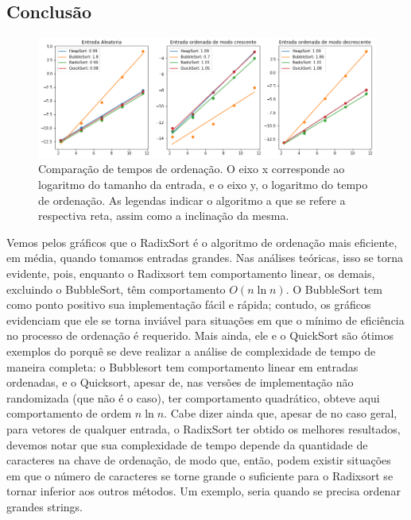 \documentclass{article}
\begin{document}
\subsection{Conclusão}
%
\begin{figure}[h]
    \centering
    \includegraphics[width=1\textwidth]{comparacao.png}
    \caption{Comparação de tempos de ordenação. O eixo x corresponde ao logaritmo do tamanho da entrada, e o eixo y, o logaritmo do tempo de ordenação. As legendas indicar o algoritmo a que se refere a respectiva reta, assim como a inclinação da mesma.}
\end{figure} \par
%
Vemos pelos gráficos que o RadixSort é o algoritmo de ordenação mais eficiente, em média, quando tomamos entradas grandes. Nas análises teóricas, isso se torna evidente, pois, enquanto o Radixsort tem comportamento linear, os demais, excluindo o BubbleSort, têm comportamento $O(n \ln n)$. O BubbleSort tem como ponto positivo sua implementação fácil e rápida; contudo, os gráficos evidenciam que ele se torna inviável para situações em que o mínimo de eficiência no processo de ordenação é requerido. Mais ainda, ele e o QuickSort são ótimos exemplos do porquê se deve realizar a análise de complexidade de tempo de maneira completa: o Bubblesort tem comportamento linear em entradas ordenadas, e o Quicksort, apesar de, nas versões de implementação não randomizada (que não é o caso), ter comportamento quadrático, obteve aqui comportamento de ordem $n\ln n$. Cabe dizer ainda que, apesar de no caso geral, para vetores de qualquer entrada, o RadixSort ter obtido os melhores resultados, devemos notar que sua complexidade de tempo depende da quantidade de caracteres na chave de ordenação, de modo que, então, podem existir situações em que o número de caracteres se torne grande o suficiente para o Radixsort se tornar inferior aos outros métodos. Um exemplo, seria quando se precisa ordenar grandes strings.
%
\end{document}
